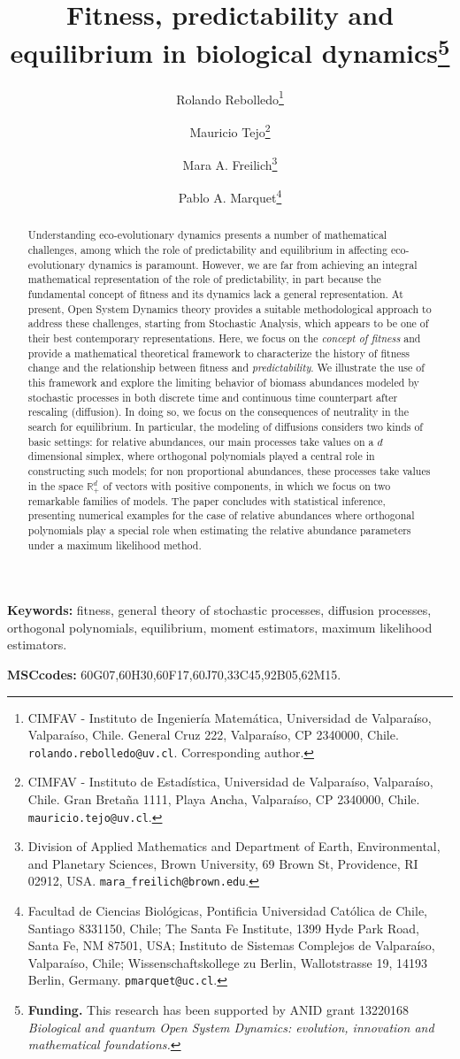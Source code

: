 \documentclass[12pt]{article}
\title{Fitness, predictability and equilibrium in biological dynamics\thanks{\textbf{Funding.} This research has been supported by ANID grant 13220168 \textit{Biological and quantum Open System Dynamics: evolution,
innovation and mathematical foundations.}}}
\author{%
Rolando Rebolledo\thanks{CIMFAV - Instituto de Ingenier\'ia Matem\'atica, Universidad de Valpara\'iso, Valpara\'iso, Chile. General Cruz 222, Valpara\'iso, CP 2340000, Chile. \texttt{rolando.rebolledo@uv.cl}. Corresponding author.}%
\and
Mauricio Tejo\thanks{CIMFAV - Instituto de Estad\'istica, Universidad de Valpara\'iso, Valpara\'iso, Chile. Gran Breta\~na 1111, Playa Ancha, Valpara\'iso, CP 2340000, Chile. \texttt{mauricio.tejo@uv.cl}.}%
\and
Mara A. Freilich\thanks{Division of Applied Mathematics and Department of Earth, Environmental, and Planetary Sciences, Brown University, 69 Brown St, Providence, RI 02912, USA. \texttt{mara\_freilich@brown.edu}.}%
\and
Pablo A. Marquet\thanks{Facultad de Ciencias Biol\'ogicas, Pontificia Universidad Cat\'olica de Chile, Santiago 8331150, Chile; The Santa Fe Institute, 1399 Hyde Park Road, Santa Fe, NM 87501, USA; Instituto de Sistemas Complejos de Valpara\'iso, Valpara\'iso, Chile; Wissenschaftskollege zu Berlin, Wallotstrasse 19, 14193 Berlin, Germany. \texttt{pmarquet@uc.cl}.}%
}
\begin{document}
\maketitle

\noindent \textbf{Keywords:}
fitness, general theory of stochastic processes, diffusion processes, orthogonal polynomials, equilibrium, moment estimators, maximum likelihood estimators.


\noindent \textbf{MSCcodes:}  
60G07,60H30,60F17,60J70,33C45,92B05,62M15.

\begin{abstract}
Understanding eco-evolutionary dynamics presents a number of mathematical challenges, among which the role of predictability and equilibrium in affecting eco-evolutionary dynamics is paramount. However, we are far from achieving an integral mathematical representation of the role of predictability, in part because the fundamental concept of fitness and its dynamics lack a general representation.
At present, Open System Dynamics theory provides a suitable methodological approach to address these challenges, starting from Stochastic Analysis, which appears to be one of their best contemporary representations. Here, we focus on the \textit{concept of fitness} and provide a mathematical theoretical framework to characterize the history of fitness change and the relationship between fitness and \textit{predictability}. 
We illustrate the use of this framework and explore the limiting behavior of biomass abundances modeled by stochastic processes in both discrete time and continuous time counterpart after rescaling (diffusion). In doing so, we focus on the consequences of neutrality in the search for equilibrium. In particular, the modeling of diffusions considers two kinds of basic settings: for relative abundances, our main processes take values on a $d$ dimensional simplex, where orthogonal polynomials played a central role in constructing such models; for non proportional abundances, these processes take values in the space $\mathbb{R}^d_+$ of vectors with positive components, in which we focus on two remarkable families of models. The paper concludes with statistical inference, presenting numerical examples for the case of relative abundances where orthogonal polynomials play a special role when estimating the relative abundance parameters under a maximum likelihood method. 
\end{abstract}





\maketitle
\end{document}
